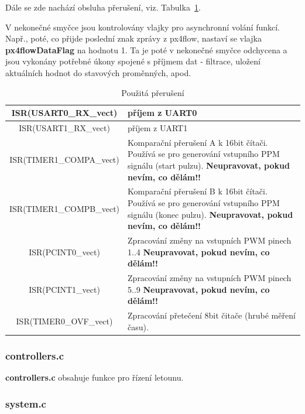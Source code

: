 \documentclass[11pt, a4paper]{article}
\begin{document}
Dále se zde nachází obsluha přerušení, viz. Tabulka~\ref{tab:interrupts}.

V nekonečné smyčce jsou kontrolovány vlajky pro asynchronní volání funkcí. Např., poté, co přijde poslední znak zprávy z px4flow, nastaví se vlajka \textbf{px4flowDataFlag} na hodnotu 1. Ta je poté v nekonečné smyčce odchycena a jsou vykonány potřebné úkony spojené s příjmem dat - filtrace, uložení aktuálních hodnot do stavových proměnných, apod.

\begin{table}
\begin{center}
\begin{tabular}{| c | p{8cm} |}
\hline
ISR(USART0\_RX\_vect) & příjem z UART0 \\
\hline
ISR(USART1\_RX\_vect) & příjem z UART1 \\
\hline
ISR(TIMER1\_COMPA\_vect) & Komparační přerušení A k 16bit čítači. Používá se pro generování vstupního PPM signálu (start pulzu).
\newline \textbf{Neupravovat, pokud nevím, co dělám!!}\\
\hline
ISR(TIMER1\_COMPB\_vect) & Komparační přerušení B k 16bit čítači. Používá se pro generování vstupního PPM signálu (konec pulzu).
\newline \textbf{Neupravovat, pokud nevím, co dělám!!}\\
\hline
ISR(PCINT0\_vect) & Zpracování změny na vstupních PWM pinech 1..4
\newline \textbf{Neupravovat, pokud nevím, co dělám!!}\\
\hline
ISR(PCINT1\_vect) & Zpracování změny na vstupních PWM pinech 5..9
\newline \textbf{Neupravovat, pokud nevím, co dělám!!}\\
\hline
ISR(TIMER0\_OVF\_vect) & Zpracování přetečení 8bit čitače (hrubé měření času). \\
\hline
\end{tabular}
\caption{Použitá přerušení}
\label{tab:interrupts}
\end{center}
\end{table}

\subsubsection{controllers.c}\label{cap:controllers}

\textbf{controllers.c} obsahuje funkce pro řízení letounu.

\subsubsection{system.c}
\end{document}
